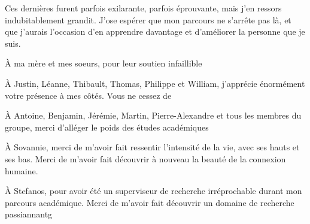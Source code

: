 \begin{comment}
\end{comment}

Ces dernières furent parfois exilarante, parfois éprouvante, mais j'en ressors indubitablement grandit. J'ose espérer que mon parcours ne s'arrête pas là, et que j'aurais l'occasion d'en apprendre davantage et d'améliorer la personne que je suis.

À ma mère et mes soeurs, pour leur soutien infaillible

À Justin, Léanne, Thibault, Thomas, Philippe et William, j'apprécie énormément votre présence à mes côtés. Vous ne cessez de 

À Antoine, Benjamin, Jérémie, Martin, Pierre-Alexandre et tous les membres du groupe, merci d'alléger le poids des études académiques

À Sovannie, merci de m'avoir fait ressentir l'intensité de la vie, avec ses hauts et ses bas. Merci de m'avoir fait découvrir à nouveau la beauté de la connexion humaine.

À Stefanos, pour avoir été un superviseur de recherche irréprochable durant mon parcours académique. Merci de m'avoir fait découvrir un domaine de recherche passiannantg  

